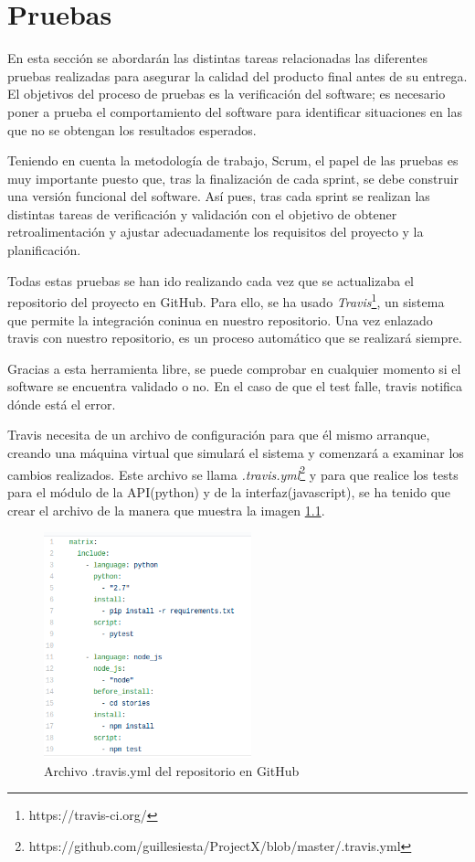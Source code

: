 \chapter{Pruebas}

En esta sección se abordarán las distintas tareas relacionadas las diferentes pruebas realizadas para asegurar la calidad del producto final antes de su entrega. El  objetivos del proceso de pruebas es la verificación del software; es necesario poner a prueba el comportamiento del software para identificar situaciones en las que no se obtengan los resultados esperados.

Teniendo en cuenta la metodología de trabajo, Scrum, el papel de las pruebas es muy importante puesto que, tras la finalización de cada sprint, se debe construir una versión funcional del software. Así pues, tras cada sprint se realizan las distintas tareas de verificación y validación con el objetivo de obtener retroalimentación y ajustar adecuadamente los requisitos del proyecto y la planificación.

Todas estas pruebas se han ido realizando cada vez que se actualizaba el repositorio del proyecto en GitHub. Para ello, se ha usado \textit{Travis}\footnote{https://travis-ci.org/}, un sistema que permite la integración coninua en nuestro repositorio. Una vez enlazado travis con nuestro repositorio, es un proceso automático que se realizará siempre.

Gracias a esta herramienta libre, se puede comprobar en cualquier momento si el software se encuentra validado o no. En el caso de que el test falle, travis notifica dónde está el error. 

Travis necesita de un archivo de configuración para que él mismo arranque, creando una máquina virtual que simulará el sistema y comenzará a examinar los cambios realizados. Este archivo se llama \textit{.travis.yml}\footnote{https://github.com/guillesiesta/ProjectX/blob/master/.travis.yml} y para que realice los tests para el módulo de la API(python) y de  la interfaz(javascript), se ha tenido que crear el archivo de la manera que muestra la imagen \ref{fig::travis}.

\begin{figure}
    \centerline{\includegraphics[width=6cm]{figuras/travis.png}}
    \caption{Archivo .travis.yml del repositorio en GitHub}
    \label{fig::travis}
\end{figure}

